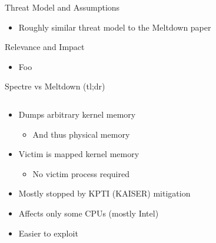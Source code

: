 \documentclass[10pt, dvipsnames, aspectratio=169]{beamer}
\begin{document}
\begin{frame}[c]{Threat Model and Assumptions}
  \begin{itemize}
    \item Roughly similar threat model to the Meltdown paper
  \end{itemize}
\end{frame}

\begin{frame}[c]{Relevance and Impact}
  \begin{itemize}
    \item Foo
  \end{itemize}
\end{frame}

\begingroup
\setwatermark{}
\begin{frame}[c]{Spectre vs Meltdown (tl;dr)}
  \begin{columns}
    \begin{column}[t]{0.5\textwidth}
      \centering
      
      \begin{itemize}
        \item Dumps arbitrary kernel memory
        \begin{itemize}
          \item And thus physical memory
        \end{itemize}
        \item Victim is mapped kernel memory
        \begin{itemize}
          \item No victim process required
        \end{itemize}
        \item Mostly stopped by KPTI (KAISER) mitigation
        \item Affects only some CPUs (mostly Intel)
        \item Easier to exploit
      \end{itemize}
    \end{column}


\end{columns}
\end{frame}
\end{document}
